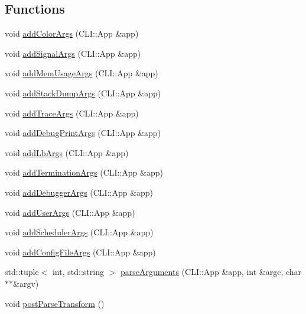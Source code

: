 \subsection*{Functions}
\begin{DoxyCompactItemize}
\item 
void \hyperlink{namespacevt_1_1arguments_ad20ec30a52a3746760ec7ce8eaaf9af4}{add\+Color\+Args} (C\+L\+I\+::\+App \&app)
\item 
void \hyperlink{namespacevt_1_1arguments_a61af811ee1284bef96edef93a52792c4}{add\+Signal\+Args} (C\+L\+I\+::\+App \&app)
\item 
void \hyperlink{namespacevt_1_1arguments_aaca43f74b5683e17a530a2227702f9e4}{add\+Mem\+Usage\+Args} (C\+L\+I\+::\+App \&app)
\item 
void \hyperlink{namespacevt_1_1arguments_a98bea139ecaff54e0b2b03afeba5a6a1}{add\+Stack\+Dump\+Args} (C\+L\+I\+::\+App \&app)
\item 
void \hyperlink{namespacevt_1_1arguments_a31bf3855abd5a792cb6c784858ef8b6c}{add\+Trace\+Args} (C\+L\+I\+::\+App \&app)
\item 
void \hyperlink{namespacevt_1_1arguments_aed7df943038a6c703af79f7bf81b0fdd}{add\+Debug\+Print\+Args} (C\+L\+I\+::\+App \&app)
\item 
void \hyperlink{namespacevt_1_1arguments_a6aad4b5d38f16351c068abfc268d5410}{add\+Lb\+Args} (C\+L\+I\+::\+App \&app)
\item 
void \hyperlink{namespacevt_1_1arguments_a700d5e06c85a85f40a3f8c36f62dddb6}{add\+Termination\+Args} (C\+L\+I\+::\+App \&app)
\item 
void \hyperlink{namespacevt_1_1arguments_a0ac7bcdb2013e7b486c1f6e052cd8731}{add\+Debugger\+Args} (C\+L\+I\+::\+App \&app)
\item 
void \hyperlink{namespacevt_1_1arguments_a1c50652e9209a72449953853975d4817}{add\+User\+Args} (C\+L\+I\+::\+App \&app)
\item 
void \hyperlink{namespacevt_1_1arguments_a586a9f239bd236bf2bc6ec02b1290fcc}{add\+Scheduler\+Args} (C\+L\+I\+::\+App \&app)
\item 
void \hyperlink{namespacevt_1_1arguments_a51a78d08f9d27671e3865515311af00a}{add\+Config\+File\+Args} (C\+L\+I\+::\+App \&app)
\item 
std\+::tuple$<$ int, std\+::string $>$ \hyperlink{namespacevt_1_1arguments_a39c463c5d2743546d1035d9654f9da77}{parse\+Arguments} (C\+L\+I\+::\+App \&app, int \&argc, char $\ast$$\ast$\&argv)
\item 
void \hyperlink{namespacevt_1_1arguments_ab06c8ee89e9ae3960b2f13a61c40f596}{post\+Parse\+Transform} ()
$$
\end{DoxyCompactItemize}
